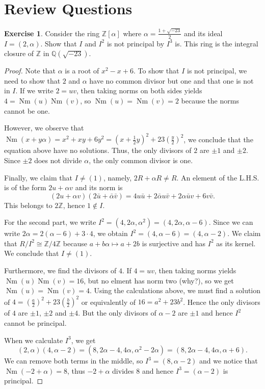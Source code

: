 \documentclass{tufte-handout} %
\theoremstyle{definition}
\newtheorem{exer}[thm]{Exercise}
\theoremstyle{remark}
\newcommand{\Z}{\mathbb{Z}}
\newcommand{\Q}{\mathbb{Q}}
\DeclareMathOperator{\Nm}{Nm}
\begin{document}
\newpage
\section{Review Questions}
\begin{exer}
	Consider the ring $\Z[\alpha]$ where $\alpha = \frac{1+\sqrt{-23}}{2}$ and its ideal $I = (2,\alpha)$. Show that $I$ and $I^2$ is not principal by $I^3$ is. This ring is the integral closure of $\Z$ in $\Q(\sqrt{-23})$.
\end{exer}
\begin{proof}
	Note that $\alpha$ is a root of $x^2-x+6$. To show that $I$ is not principal, we need to show that $2$ and $\alpha$ have no common divisor but one and that one is not in $I$. If we write $2 = uv$, then taking norms on both sides yields $4 = \Nm(u)\Nm(v)$, so $\Nm(u) = \Nm(v) = 2$ because the norms cannot be one.
	
	However, we observe that $\Nm(x+y\alpha) = x^2+xy+6y^2 = (x+\frac{1}{2}y)^2 + 23(\frac{y}{2})^2$, we conclude that the equation above have no solutions. Thus, the only divisors of $2$ are $\pm 1$ and $\pm 2$. Since $\pm 2$ does not divide $\alpha$, the only common divisor is one.
	
	Finally, we claim that $I \neq (1)$, namely, $2R + \alpha R \neq R$. An element of the L.H.S. is of the form $2u + \alpha v$ and its norm is
	\[(2u+\alpha v)(2\bar{u}+\bar{\alpha}\bar{v}) = 4u\bar{u} + 2\bar{\alpha}u\bar{v} +  2\alpha\bar{u}v + 6v\bar{v}.\]
	This belongs to $2\Z$, hence $1 \notin I$.
	
	For the second part, we write $I^2 = (4, 2\alpha, \alpha^2) = (4,2\alpha, \alpha -6)$. Since we can write $2\alpha = 2(\alpha-6) + 3\cdot 4$, we obtain $I^2 = (4, \alpha-6) = (4,\alpha-2)$. We claim that $R/I^2 \cong \Z/4\Z$ because $a + b\alpha \mapsto a+2b$ is surjective and has $I^2$ as its kernel. We conclude that $I \neq (1)$.
	
	Furthermore, we find the divisors of $4$. If $4 = uv$, then taking norms yields $\Nm(u) \Nm(v) = 16$, but no elment has norm two (why?), so we get $\Nm(u) = \Nm(v) = 4$. Using the calculations above, we must find a solution of $4 = (\frac{a}{2})^2 + 23(\frac{b}{2})^2$ or equivalently of $16 = a^2 + 23b^2$. Hence the only divisors of $4$ are $\pm 1$, $\pm 2$ and $\pm 4$. But the only divisors of $\alpha-2$ are $\pm 1$ and hence $I^2$ cannot be principal.
	
	When we calculate $I^3$, we get \[(2,\alpha)(4,\alpha-2) = (8,2\alpha-4,4\alpha, \alpha^2-2\alpha) = (8, 2\alpha- 4, 4\alpha, \alpha+6).\]
	We can remove both terms in the middle, so $I^3 = (8,\alpha-2)$ and we notice that $\Nm(-2+\alpha) = 8$, thus $-2+\alpha$ divides $8$ and hence $I^3 = (\alpha-2)$ is principal.
\end{proof}
\end{document}
